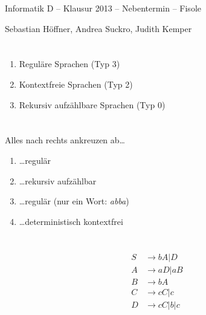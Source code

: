 \documentclass{article}
\begin{document}
\begin{center}
  \Large{Informatik D -- Klausur 2013 -- Nebentermin -- Fisole}

  \large{Sebastian Höffner, Andrea Suckro, Judith Kemper}
\end{center}

\section{}
\begin{enumerate}
	\item Reguläre Sprachen (Typ 3)
	\item Kontextfreie Sprachen (Typ 2)
	\item Rekursiv aufzählbare Sprachen (Typ 0)
\end{enumerate}


\section{}
Alles nach rechts ankreuzen ab\dots
\begin{enumerate}
	\item \dots regulär
  \item \dots rekursiv aufzählbar
  \item \dots regulär (nur ein Wort: \emph{abba})
  \item \dots deterministisch kontextfrei
\end{enumerate}

\section{}
\begin{align*}
S &\rightarrow bA | D\\
A &\rightarrow aD | aB\\
B &\rightarrow bA\\
C &\rightarrow cC | c\\
D &\rightarrow cC | b | c
\end{align*}
\end{document}
